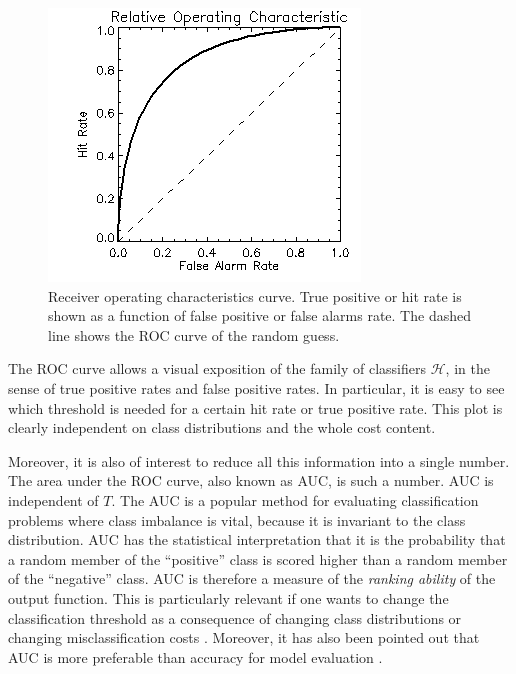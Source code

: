 \begin{figure}[ht!]
\centering
\includegraphics[scale=0.70]{figures/ROC.png}
\caption{\label{fig:ROC} Receiver operating characteristics curve.  True positive or hit rate is shown as a function of false positive or false alarms rate.  The dashed line shows the ROC curve of the random guess.}
\end{figure}


The ROC curve allows a visual exposition of the family of classifiers $\mathcal{H}$, in the sense of true positive rates and false positive rates.  In particular, it is easy to see which threshold is needed for a certain hit rate or true positive rate.  This plot is clearly independent on class distributions and the whole cost content.

Moreover, it is also of interest to reduce all this information into a single number.  The area under the ROC curve, also known as AUC, is such a number.  
AUC is independent of $T$. The AUC is a popular method for evaluating classification problems where class imbalance is vital, because it is invariant to the class distribution. 
AUC has the statistical interpretation that it is the probability that a random member of the ``positive'' class is scored higher than a random member of the ``negative'' class.  
AUC is therefore a measure of the \emph{ranking ability} of the output function.  
This is particularly relevant if one wants to change the classification threshold as a consequence of changing class distributions or  changing misclassification costs \cite{Wu07}.  
Moreover, it has also been pointed out that AUC is more preferable than accuracy for model evaluation \cite{Gam10}.  




